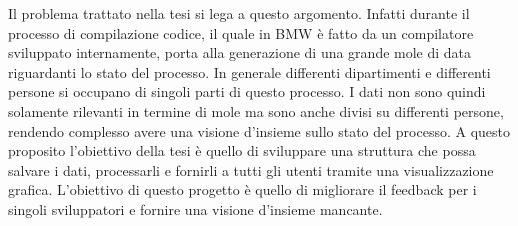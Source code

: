 \documentclass[../main.tex]{subfiles}
\begin{document}
Il problema trattato nella tesi si lega a questo argomento. Infatti durante il processo di compilazione codice, il quale in \gls{BMW} è fatto da un compilatore sviluppato internamente, porta alla generazione di una grande mole di data riguardanti lo stato del processo. In generale differenti dipartimenti e differenti persone si occupano di singoli parti di questo processo. I dati non sono quindi solamente rilevanti in termine di mole ma sono anche divisi su differenti persone, rendendo complesso avere una visione d'insieme sullo stato del processo. A questo proposito l'obiettivo della tesi è quello di sviluppare una struttura che possa salvare i dati, processarli e fornirli a tutti gli utenti tramite una visualizzazione grafica. L'obiettivo di questo progetto è quello di migliorare il feedback per i singoli sviluppatori e fornire una visione d'insieme mancante. 
\section{}
\cleardoublepage
\end{document}
